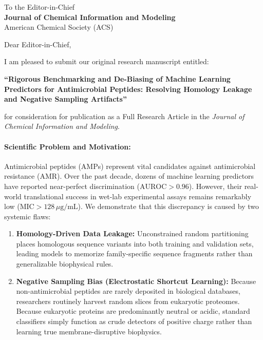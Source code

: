 \documentclass[11pt,a4paper]{letter}
\begin{document}
\begin{letter}{
To the Editor-in-Chief\\
\textbf{Journal of Chemical Information and Modeling}\\
American Chemical Society (ACS)
}

\address{
\textbf{Ronie Martínez}\\
Departamento de Informática y Ciencias de la Computación\\
Escuela Politécnica Nacional\\
Quito 170517, Ecuador\\
Email: \href{mailto:ronie.martinez@epn.edu.ec}{ronie.martinez@epn.edu.ec}
}

\opening{Dear Editor-in-Chief,}

I am pleased to submit our original research manuscript entitled:

\begin{center}
\large\textbf{``Rigorous Benchmarking and De-Biasing of Machine Learning Predictors for Antimicrobial Peptides: Resolving Homology Leakage and Negative Sampling Artifacts''}
\end{center}

for consideration for publication as a Full Research Article in the \textit{Journal of Chemical Information and Modeling}.

\paragraph{Scientific Problem and Motivation:}
Antimicrobial peptides (AMPs) represent vital candidates against antimicrobial resistance (AMR). Over the past decade, dozens of machine learning predictors have reported near-perfect discrimination ($\text{AUROC} > 0.96$). However, their real-world translational success in wet-lab experimental assays remains remarkably low ($\text{MIC} > 128\,\mu\text{g/mL}$). We demonstrate that this discrepancy is caused by two systemic flaws:
\begin{enumerate}
    \item \textbf{Homology-Driven Data Leakage:} Unconstrained random partitioning places homologous sequence variants into both training and validation sets, leading models to memorize family-specific sequence fragments rather than generalizable biophysical rules.
    \item \textbf{Negative Sampling Bias (Electrostatic Shortcut Learning):} Because non-antimicrobial peptides are rarely deposited in biological databases, researchers routinely harvest random slices from eukaryotic proteomes. Because eukaryotic proteins are predominantly neutral or acidic, standard classifiers simply function as crude detectors of positive charge rather than learning true membrane-disruptive biophysics.
\end{enumerate}


\end{letter}
\end{document}
